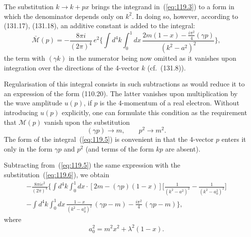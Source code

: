 The substitution $k \to k + px$ brings the integrand in~(\ref{eq:119.3}) to a form in which the denominator depends only on $k^2$. In doing so, however, according to (131.17), (131.18), an additive constant is added to the integral:
\begin{equation}
\bar{\mathcal{M}}(p) = -\frac{8\pi i}{(2\pi)^4}\,e^2 \bigg\{\int d^4k \int_0^1 dx\,\frac{2m(1-x) - \frac{i\pi^2}{4}(\gamma p)}{(k^2 - a^2)^2} \bigg\},
\label{eq:119.5}
\end{equation}
the term with $(\gamma k)$ in the numerator being now omitted as it vanishes upon integration over the directions of the 4-vector $k$ (cf.\ (131.8)).


Regularisation of this integral consists in such subtractions as would reduce it to an expression of the form (110.20). The latter vanishes upon multiplication by the wave amplitude $u(p)$, if $p$ is the 4-momentum of a real electron. Without introducing $u(p)$ explicitly, one can formulate this condition as the requirement that $\mathcal{M}(p)$ vanish upon the substitution
\begin{equation}
(\gamma p) \to m, \qquad p^2 \to m^2.
\label{eq:119.6}
\end{equation}
The form of the integral~(\ref{eq:119.5}) is convenient in that the 4-vector $p$ enters it only in the form $\gamma p$ and $p^2$ (and terms of the form $kp$ are absent).

Subtracting from~(\ref{eq:119.5}) the same expression with the substitution~(\ref{eq:119.6}), we obtain
\begin{multline}
-\frac{8\pi i e^2}{(2\pi)^4} \bigg\{ \int d^4k \int_0^1 dx \cdot [2m - (\gamma p)(1-x)] \bigg[\frac{1}{(k^2 - a^2)^2} - \frac{1}{(k^2 - a_0^2)^2}\bigg] \\
- \int d^4k \int_0^1 dx\,\frac{1-x}{(k^2 - a_0^2)^2}\,(\gamma p - m) - \frac{i\pi^2}{4}\,(\gamma p - m) \bigg\},
\label{eq:119.7}
\end{multline}
where
\[
a_0^2 = m^2 x^2 + \lambda^2(1-x).
\]

